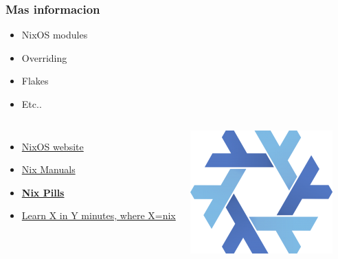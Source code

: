 \documentclass[aspectratio=43]{beamer}
\begin{document}
\begin{frame}
\frametitle{Mas informacion}
\begin{center}
\begin{itemize}
    \item \begin{center}NixOS modules\end{center}
    \item \begin{center}Overriding\end{center}
    \item \begin{center}Flakes\end{center}
    \item \begin{center}Etc..\end{center}
\end{itemize}
\end{center}
\begin{columns}
\begin{itemize}
    \item \href{https://nixos.org}{NixOS website}
    \item  \href{https://nixos.org/manual/nixos/stable/}{Nix Manuals}
    \item  \href{https://nixos.org/guides/nix-pills/}{\textbf{Nix Pills}}
    \item  \href{https://learnxinyminutes.com/docs/nix/}{Learn X in Y minutes, where X=nix}
\end{itemize}
            \includegraphics[scale=0.4]{img/207px-Home-nixos-logo.png}
\end{columns}
\end{frame}
\end{document}
